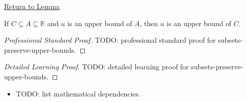 \newpage
{}
\label{prf:subsets-preserve-upper-bounds}

\begin{remark*}[Return]
\hyperref[lem:subsets-preserve-upper-bounds]{Return to Lemma}
\end{remark*}

\begin{lemma*}
If $C\subseteq A\subseteq\mathbb{R}$ and $u$ is an upper bound of $A$, then
$u$ is an upper bound of $C$.
\end{lemma*}

\begin{proof}[Professional Standard Proof]
\LRAProofBodyStart
TODO: professional standard proof for subsets-preserve-upper-bounds.
\end{proof}

\begin{proof}[Detailed Learning Proof]
\LRAProofBodyStart
TODO: detailed learning proof for subsets-preserve-upper-bounds.
\end{proof}

\begin{remark*}
\end{remark*}

\begin{dependencies}
\begin{itemize}
  \item TODO: list mathematical dependencies.
\end{itemize}
\end{dependencies}

\clearpage
